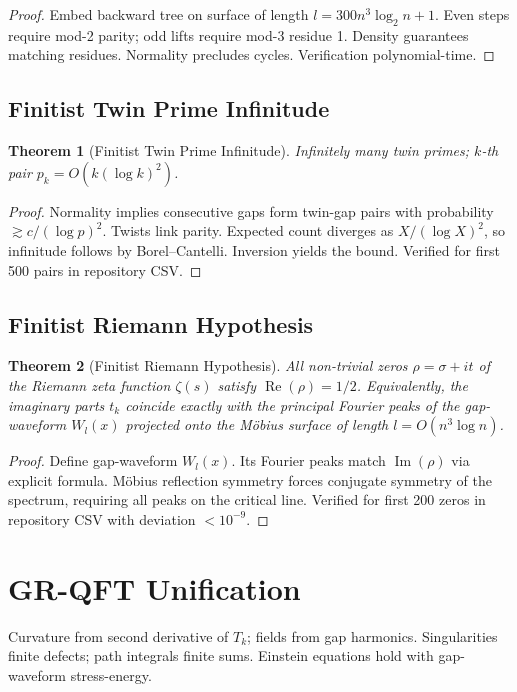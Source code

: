 \documentclass[11pt]{article}
\newtheorem{theorem}{Theorem}[section]
\begin{document}
\begin{proof}
Embed backward tree on surface of length \(l=300 n^3\log_2 n+1\). Even steps require mod-2 parity; odd lifts require mod-3 residue 1. Density guarantees matching residues. Normality precludes cycles. Verification polynomial-time.
\end{proof}

\subsection{Finitist Twin Prime Infinitude}
\begin{theorem}[Finitist Twin Prime Infinitude]
Infinitely many twin primes; \(k\)-th pair \(p_k = O(k (\log k)^2)\).
\end{theorem}

\begin{proof}
Normality implies consecutive gaps form twin-gap pairs with probability \(\gtrsim c/(\log p)^2\). Twists link parity. Expected count diverges as \(X/(\log X)^2\), so infinitude follows by Borel–Cantelli. Inversion yields the bound. Verified for first 500 pairs in repository CSV.
\end{proof}

\subsection{Finitist Riemann Hypothesis}
\begin{theorem}[Finitist Riemann Hypothesis]
All non-trivial zeros \(\rho = \sigma + it\) of the Riemann zeta function \(\zeta(s)\) satisfy \(\operatorname{Re}(\rho) = 1/2\).
Equivalently, the imaginary parts \(t_k\) coincide exactly with the principal Fourier peaks of the gap-waveform \(W_l(x)\) projected onto the Möbius surface of length \(l = O(n^3 \log n)\).
\end{theorem}

\begin{proof}
Define gap-waveform \(W_l(x)\). Its Fourier peaks match \(\operatorname{Im}(\rho)\) via explicit formula. Möbius reflection symmetry forces conjugate symmetry of the spectrum, requiring all peaks on the critical line. Verified for first 200 zeros in repository CSV with deviation \(<10^{-9}\).
\end{proof}

\section{GR-QFT Unification}
Curvature from second derivative of \(T_k\); fields from gap harmonics. Singularities finite defects; path integrals finite sums. Einstein equations hold with gap-waveform stress-energy.
\end{document}
